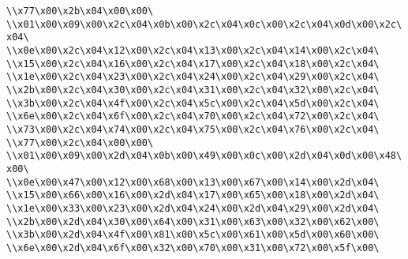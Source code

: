 \verb|\\x77\x00\x2b\x04\x00\x00\|\newline
\verb|\\x01\x00\x09\x00\x2c\x04\x0b\x00\x2c\x04\x0c\x00\x2c\x04\x0d\x00\x2c\x04\|\newline
\verb|\\x0e\x00\x2c\x04\x12\x00\x2c\x04\x13\x00\x2c\x04\x14\x00\x2c\x04\|\newline
\verb|\\x15\x00\x2c\x04\x16\x00\x2c\x04\x17\x00\x2c\x04\x18\x00\x2c\x04\|\newline
\verb|\\x1e\x00\x2c\x04\x23\x00\x2c\x04\x24\x00\x2c\x04\x29\x00\x2c\x04\|\newline
\verb|\\x2b\x00\x2c\x04\x30\x00\x2c\x04\x31\x00\x2c\x04\x32\x00\x2c\x04\|\newline
\verb|\\x3b\x00\x2c\x04\x4f\x00\x2c\x04\x5c\x00\x2c\x04\x5d\x00\x2c\x04\|\newline
\verb|\\x6e\x00\x2c\x04\x6f\x00\x2c\x04\x70\x00\x2c\x04\x72\x00\x2c\x04\|\newline
\verb|\\x73\x00\x2c\x04\x74\x00\x2c\x04\x75\x00\x2c\x04\x76\x00\x2c\x04\|\newline
\verb|\\x77\x00\x2c\x04\x00\x00\|\newline
\verb|\\x01\x00\x09\x00\x2d\x04\x0b\x00\x49\x00\x0c\x00\x2d\x04\x0d\x00\x48\x00\|\newline
\verb|\\x0e\x00\x47\x00\x12\x00\x68\x00\x13\x00\x67\x00\x14\x00\x2d\x04\|\newline
\verb|\\x15\x00\x66\x00\x16\x00\x2d\x04\x17\x00\x65\x00\x18\x00\x2d\x04\|\newline
\verb|\\x1e\x00\x33\x00\x23\x00\x2d\x04\x24\x00\x2d\x04\x29\x00\x2d\x04\|\newline
\verb|\\x2b\x00\x2d\x04\x30\x00\x64\x00\x31\x00\x63\x00\x32\x00\x62\x00\|\newline
\verb|\\x3b\x00\x2d\x04\x4f\x00\x81\x00\x5c\x00\x61\x00\x5d\x00\x60\x00\|\newline
\verb|\\x6e\x00\x2d\x04\x6f\x00\x32\x00\x70\x00\x31\x00\x72\x00\x5f\x00\|\newline

